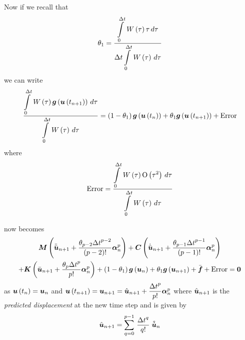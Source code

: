 Now if we recall that
\begin{equation}
\theta_{1}=\dfrac{  \displaystyle\int\limits_{0}^{\Delta t} \, W\left( \tau \right) \tau\,d\tau }{\Delta t  \displaystyle\int\limits_{0}^{\Delta t} \, W\left( \tau \right) \,d\tau }
\end{equation}
we can write
\begin{equation}
  \dfrac{\gint{0}{\Delta t}{\fnof{W}{\tau}\fnof{\vect{g}}{\fnof{\vect{u}}{t_{n+1}}}}{\tau}}
  {\gint{0}{\Delta t}{\fnof{W}{\tau}}{\tau}}=\pbrac{1-\theta_{1}}\fnof{\vect{g}}{\fnof{\vect{u}}{t_{n}}}+
  \theta_{1}\fnof{\vect{g}}{\fnof{\vect{u}}{t_{n+1}}}+\text{Error}
\end{equation}
where
\begin{equation}
  \text{Error}=\dfrac{  \displaystyle\int\limits_{0}^{\Delta t} \, W\left( \tau \right)  \mathrm{O}\left( \tau^{2} \right) \,d\tau }{
      \displaystyle\int\limits_{0}^{\Delta t} \, W\left( \tau \right) \,d\tau }
\end{equation}

 now becomes
\begin{multline}
  \matr{M}\pbrac{\ddot{\bar{\vect{u}}}_{n+1}+\dfrac{\theta_{p-2}{\Delta
        t}^{p-2}}{\factorial{p-2}}\vect{\alpha}^{p}_{n}}+
  \matr{C}\pbrac{\dot{\bar{\vect{u}}}_{n+1}+\dfrac{\theta_{p-1}{\Delta
        t}^{p-1}}{\factorial{p-1}}\vect{\alpha}^{p}_{n}}\\
  +\matr{K}\pbrac{\bar{\vect{u}}_{n+1}+\dfrac{\theta_{p}{\Delta
        t}^{p}}{p!}\vect{\alpha}^{p}_{n}}+ 
  \pbrac{1-\theta_{1}}\fnof{\vect{g}}{\vect{u}_{n}}+\theta_{1}\fnof{\vect{g}}{\vect{u}_{n+1}}+\bar{\vect{f}}+
  \text{Error}=\vect{0}
  \label{eqn:dynamic2}
\end{multline}
as $\fnof{\vect{u}}{t_{n}}=\vect{u}_{n}$ and
$\fnof{\vect{u}}{t_{n+1}}=\vect{u}_{n+1}=\hat{\vect{u}}_{n+1}+
\dfrac{{\Delta t}^{p}}{p!}\vect{\alpha}^{p}_{n}$ where $\hat{\vect{u}}_{n+1}$
is the \emph{predicted displacement} at the new time step and is given by
\begin{equation}
  \hat{\vect{u}}_{n+1}=\gsum{q=0}{p-1}{\dfrac{{\Delta
        t}^{q}}{q!}\symover{q}{\vect{u}}_{n}}
\end{equation}

